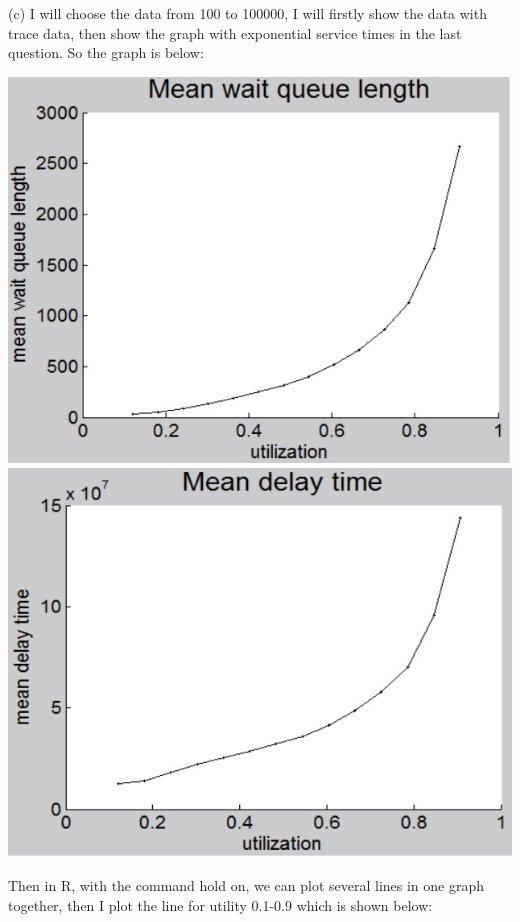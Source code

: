 \documentclass[11pt]{article}
\begin{document}
(c) I will choose the data from 100 to 100000, I will firstly show the data with trace data, then show the graph with exponential service times in the last question. So the graph is below: 
\begin{center}
\includegraphics[scale=0.3]{wdev_0_meanwait_common.png}
\includegraphics[scale=0.3]{wdev_0_mean_exponential.png}
\end{center}
Then in R, with the command hold on, we can plot several lines in one graph together, then I plot the line for utility 0.1-0.9 which is shown below: \\
\end{document}
